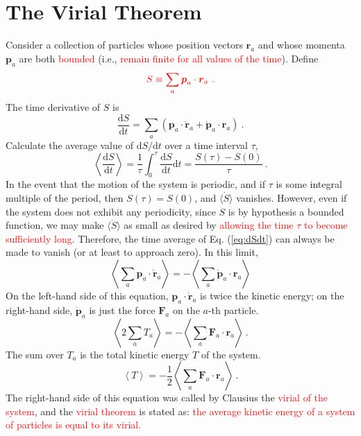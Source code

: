 \documentclass[11pt,a4paper]{article}
\renewcommand{\vec}[1]{\boldsymbol{#1}}
\newcommand{\dif}{\mathrm{d}}
\newcounter{theo}[section]\setcounter{theo}{0}
\begin{document}
\section{The Virial Theorem}
\cite{marion1965classical, Thornton} Consider a collection of particles whose position vectors $\vec{r}_a$ and whose momenta $\vec{p}_a$ are both \textcolor{red}{bounded} (i.e., \textcolor{red}{remain finite for all values of the time}). Define
\begin{equation}
\color{red} S \equiv \sum_a \vec{p}_a \cdot \vec{r}_a ~.
\end{equation}
The time derivative of $S$ is
\begin{equation}
\dfrac{\dif S}{\dif t} = \sum_a (\vec{p}_a \cdot \dot{\vec{r}}_a +\dot{\vec{p}}_a \cdot \vec{r}_a) ~.
\label{eq:dSdt}
\end{equation}
Calculate the average value of $\dif S/\dif t$ over a time interval $\tau$,
\begin{equation}
\left\langle \dfrac{\dif S}{\dif t} \right\rangle = \dfrac{1}{\tau} \int_0^\tau \dfrac{\dif S}{\dif t} \dif t = \dfrac{S(\tau) -S(0)}{\tau} ~.
\end{equation}
In the event that the motion of the system is periodic, and if $\tau$ is some integral multiple of the period, then $S(\tau) = S(0)$, and $\langle \dot{S} \rangle$ vanishes. However, even if the system does not exhibit any periodicity, since $S$ is by hypothesis a bounded function, we may make $\langle \dot{S} \rangle$ as small as desired by \textcolor{red}{allowing the time $\tau$ to become sufficiently long}. Therefore, the time average of Eq. (\ref{eq:dSdt}) can always be made to vanish (or at least to approach zero). In this limit,
\begin{equation}
\left\langle \sum_a \vec{p}_a \cdot \dot{\vec{r}}_a \right\rangle = - \left\langle \sum_a \dot{\vec{p}}_a \cdot \vec{r}_a \right\rangle
\end{equation}
On the left-hand side of this equation, $\vec{p}_a\cdot \dot{\vec{r}}_a$ is twice the kinetic energy; on the right-hand side, $\dot{\vec{p}}_a$ is just the force $\vec{F}_a$ on the $a$-th particle. 
\begin{equation}
\left\langle 2 \sum_a T_a \right\rangle = - \left\langle \sum_a \vec{F}_a \cdot \vec{r}_a \right\rangle ~.
\end{equation}
The sum over $T_a$ is the total kinetic energy $T$ of the system.
\begin{equation}
\left\langle T \right\rangle = -\dfrac{1}{2} \left\langle \sum_a \vec{F}_a \cdot \vec{r}_a \right\rangle ~.
\end{equation}
The right-hand side of this equation was called by Clausius the \textcolor{red}{virial of the system}, and the \textcolor{red}{virial theorem} is stated as: \textcolor{red}{the average kinetic energy of a system of particles is equal to its virial.}
\end{document}

